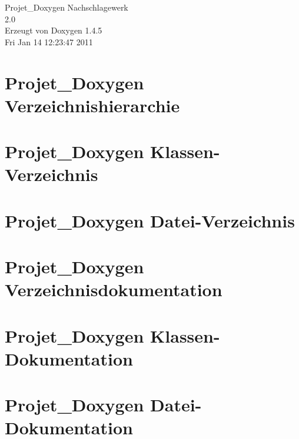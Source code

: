 \documentclass[a4paper]{book}
\begin{document}
\begin{titlepage}
\vspace*{7cm}
\begin{center}
{\Large Projet\_\-Doxygen Nachschlagewerk\\[1ex]\large 2.0 }\\
\vspace*{1cm}
{\large Erzeugt von Doxygen 1.4.5}\\
\vspace*{0.5cm}
{\small Fri Jan 14 12:23:47 2011}\\
\end{center}
\end{titlepage}
\clearemptydoublepage
{}
\tableofcontents
\clearemptydoublepage
{}
\chapter{Projet\_\-Doxygen Verzeichnishierarchie}

\chapter{Projet\_\-Doxygen Klassen-Verzeichnis}

\chapter{Projet\_\-Doxygen Datei-Verzeichnis}

\chapter{Projet\_\-Doxygen Verzeichnisdokumentation}












\chapter{Projet\_\-Doxygen Klassen-Dokumentation}

\chapter{Projet\_\-Doxygen Datei-Dokumentation}









\printindex
\end{document}
